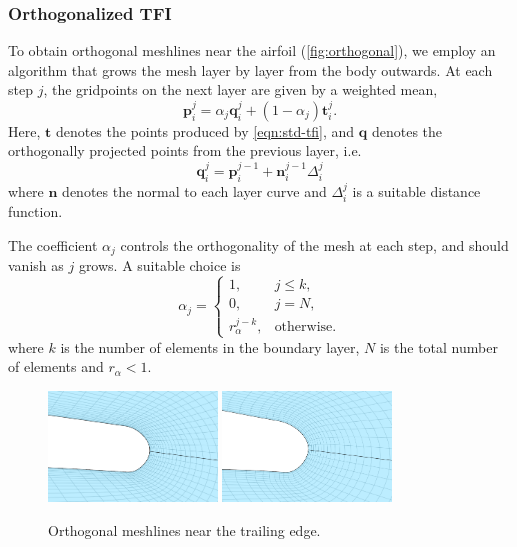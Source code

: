 \documentclass[3p,times,procedia]{elsarticle}
\begin{document}
\subsubsection{Orthogonalized TFI}

To obtain orthogonal meshlines near the airfoil (\autoref{fig:orthogonal}), we
employ an algorithm that grows the mesh layer by layer from the body outwards.
At each step $j$, the gridpoints on the next layer are given by a weighted mean,
\begin{equation} \label{eqn:blending}
  \bm{p}^j_i = \alpha_j \bm{q}^j_i + (1 - \alpha_j) \bm{t}^j_i.
\end{equation}
Here, $\bm{t}$ denotes the points produced by \eqref{eqn:std-tfi}, and $\bm{q}$
denotes the orthogonally projected points from the previous layer, i.e.
\[
  \bm{q}^j_i = \bm{p}^{j-1}_i + \bm{n}^{j-1}_i \Delta^j_i
\]
where $\bm{n}$ denotes the normal to each layer curve and $\Delta^j_i$ is a
suitable distance function.

The coefficient $\alpha_j$ controls the orthogonality of the mesh at each step,
and should vanish as $j$ grows. A suitable choice is
\[
  \alpha_j = \begin{cases}
    1, & j \leq k, \\
    0, & j = N, \\
    r_\alpha^{j-k}, & \text{otherwise.}
  \end{cases}
\]
where $k$ is the number of elements in the boundary layer, $N$ is the total
number of elements and $r_\alpha < 1$.

\begin{figure}
  \centering
  \includegraphics[width=0.4\textwidth]{figs/nonorthogonal}
  \includegraphics[width=0.4\textwidth]{figs/orthogonal}
  \caption{Orthogonal meshlines near the trailing edge.}
  \label{fig:orthogonal}
\end{figure}
\end{document}
